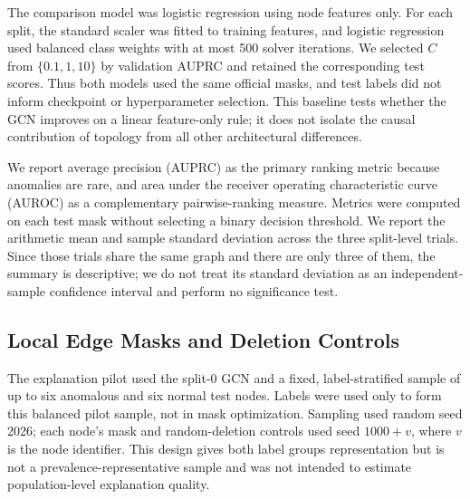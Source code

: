 \documentclass[11pt,a4paper]{article}
\begin{document}
The comparison model was logistic regression using node features only. For each split, the standard scaler was fitted to training features, and logistic regression used balanced class weights with at most 500 solver iterations. We selected $C$ from $\{0.1,1,10\}$ by validation AUPRC and retained the corresponding test scores. Thus both models used the same official masks, and test labels did not inform checkpoint or hyperparameter selection. This baseline tests whether the GCN improves on a linear feature-only rule; it does not isolate the causal contribution of topology from all other architectural differences.

We report average precision (AUPRC) as the primary ranking metric because anomalies are rare, and area under the receiver operating characteristic curve (AUROC) as a complementary pairwise-ranking measure. Metrics were computed on each test mask without selecting a binary decision threshold. We report the arithmetic mean and sample standard deviation across the three split-level trials. Since those trials share the same graph and there are only three of them, the summary is descriptive; we do not treat its standard deviation as an independent-sample confidence interval and perform no significance test.

\subsection{Local Edge Masks and Deletion Controls}
The explanation pilot used the split-0 GCN and a fixed, label-stratified sample of up to six anomalous and six normal test nodes. Labels were used only to form this balanced pilot sample, not in mask optimization. Sampling used random seed 2026; each node's mask and random-deletion controls used seed $1000+v$, where $v$ is the node identifier. This design gives both label groups representation but is not a prevalence-representative sample and was not intended to estimate population-level explanation quality.
\end{document}
